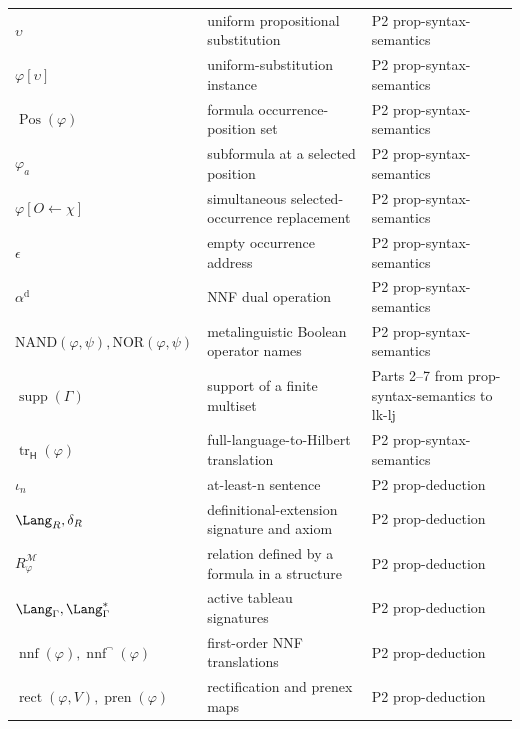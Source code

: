 \begin{longtable}{@{}p{}p{}p{}@{}}
\(\upsilon\) & uniform propositional substitution & P2 prop-\allowbreak{}syntax-\allowbreak{}semantics \\
\(\varphi[\upsilon]\) & uniform-substitution instance & P2 prop-\allowbreak{}syntax-\allowbreak{}semantics \\
\(\operatorname{Pos}(\varphi)\) & formula occurrence-position set & P2 prop-\allowbreak{}syntax-\allowbreak{}semantics \\
\(\varphi_a\) & subformula at a selected position & P2 prop-\allowbreak{}syntax-\allowbreak{}semantics \\
\(\varphi[O\leftarrow\chi]\) & simultaneous selected-occurrence replacement & P2 prop-\allowbreak{}syntax-\allowbreak{}semantics \\
\(\epsilon\) & empty occurrence address & P2 prop-\allowbreak{}syntax-\allowbreak{}semantics \\
\(\alpha^{\mathrm d}\) & NNF dual operation & P2 prop-\allowbreak{}syntax-\allowbreak{}semantics \\
\(\mathrm{NAND}(\varphi,\allowbreak \psi),\allowbreak \mathrm{NOR}(\varphi,\allowbreak \psi)\) & metalinguistic Boolean operator names & P2 prop-\allowbreak{}syntax-\allowbreak{}semantics \\
\(\operatorname{supp}(\Gamma)\) & support of a finite multiset & Parts 2--7 from prop-\allowbreak{}syntax-\allowbreak{}semantics to lk-\allowbreak{}lj \\
\(\operatorname{tr}_{\mathsf H}(\varphi)\) & full-language-to-Hilbert translation & P2 prop-\allowbreak{}syntax-\allowbreak{}semantics \\
\(\iota_n\) & at-least-n sentence & P2 prop-\allowbreak{}deduction \\
\(\Lang_R,\allowbreak \delta_R\) & definitional-extension signature and axiom & P2 prop-\allowbreak{}deduction \\
\(R^{\mathcal M}_{\varphi}\) & relation defined by a formula in a structure & P2 prop-\allowbreak{}deduction \\
\(\Lang_{\Gamma},\allowbreak \Lang_{\Gamma}^{*}\) & active tableau signatures & P2 prop-\allowbreak{}deduction \\
\(\operatorname{nnf}(\varphi),\allowbreak \operatorname{nnf}^{\neg}(\varphi)\) & first-order NNF translations & P2 prop-\allowbreak{}deduction \\
\(\operatorname{rect}(\varphi,\allowbreak V),\allowbreak \operatorname{pren}(\varphi)\) & rectification and prenex maps & P2 prop-\allowbreak{}deduction \\

\end{longtable}
